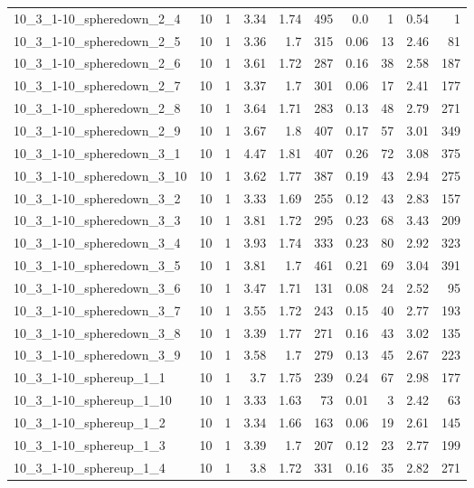 \begin{center}
\begin{scriptsize}
\begin{longtable}{lrrrrrrrrr}
10\_3\_1-10\_spheredown\_2\_4 & 10 & 1 & 3.34 & 1.74 & 495 & 0.0 & 1 & 0.54 & 1\\
10\_3\_1-10\_spheredown\_2\_5 & 10 & 1 & 3.36 & 1.7 & 315 & 0.06 & 13 & 2.46 & 81\\
10\_3\_1-10\_spheredown\_2\_6 & 10 & 1 & 3.61 & 1.72 & 287 & 0.16 & 38 & 2.58 & 187\\
10\_3\_1-10\_spheredown\_2\_7 & 10 & 1 & 3.37 & 1.7 & 301 & 0.06 & 17 & 2.41 & 177\\
10\_3\_1-10\_spheredown\_2\_8 & 10 & 1 & 3.64 & 1.71 & 283 & 0.13 & 48 & 2.79 & 271\\
10\_3\_1-10\_spheredown\_2\_9 & 10 & 1 & 3.67 & 1.8 & 407 & 0.17 & 57 & 3.01 & 349\\
10\_3\_1-10\_spheredown\_3\_1 & 10 & 1 & 4.47 & 1.81 & 407 & 0.26 & 72 & 3.08 & 375\\
10\_3\_1-10\_spheredown\_3\_10 & 10 & 1 & 3.62 & 1.77 & 387 & 0.19 & 43 & 2.94 & 275\\
10\_3\_1-10\_spheredown\_3\_2 & 10 & 1 & 3.33 & 1.69 & 255 & 0.12 & 43 & 2.83 & 157\\
10\_3\_1-10\_spheredown\_3\_3 & 10 & 1 & 3.81 & 1.72 & 295 & 0.23 & 68 & 3.43 & 209\\
10\_3\_1-10\_spheredown\_3\_4 & 10 & 1 & 3.93 & 1.74 & 333 & 0.23 & 80 & 2.92 & 323\\
10\_3\_1-10\_spheredown\_3\_5 & 10 & 1 & 3.81 & 1.7 & 461 & 0.21 & 69 & 3.04 & 391\\
10\_3\_1-10\_spheredown\_3\_6 & 10 & 1 & 3.47 & 1.71 & 131 & 0.08 & 24 & 2.52 & 95\\
10\_3\_1-10\_spheredown\_3\_7 & 10 & 1 & 3.55 & 1.72 & 243 & 0.15 & 40 & 2.77 & 193\\
10\_3\_1-10\_spheredown\_3\_8 & 10 & 1 & 3.39 & 1.77 & 271 & 0.16 & 43 & 3.02 & 135\\
10\_3\_1-10\_spheredown\_3\_9 & 10 & 1 & 3.58 & 1.7 & 279 & 0.13 & 45 & 2.67 & 223\\
10\_3\_1-10\_sphereup\_1\_1 & 10 & 1 & 3.7 & 1.75 & 239 & 0.24 & 67 & 2.98 & 177\\
10\_3\_1-10\_sphereup\_1\_10 & 10 & 1 & 3.33 & 1.63 & 73 & 0.01 & 3 & 2.42 & 63\\
10\_3\_1-10\_sphereup\_1\_2 & 10 & 1 & 3.34 & 1.66 & 163 & 0.06 & 19 & 2.61 & 145\\
10\_3\_1-10\_sphereup\_1\_3 & 10 & 1 & 3.39 & 1.7 & 207 & 0.12 & 23 & 2.77 & 199\\
10\_3\_1-10\_sphereup\_1\_4 & 10 & 1 & 3.8 & 1.72 & 331 & 0.16 & 35 & 2.82 & 271\\

\end{longtable}
\end{scriptsize}
\end{center}
